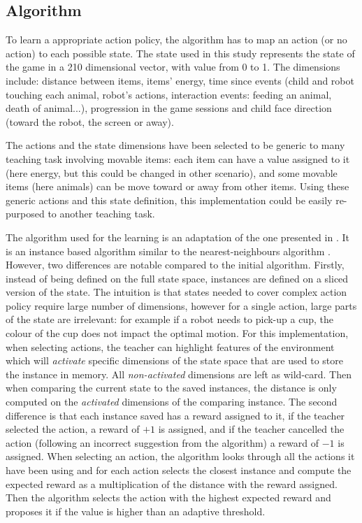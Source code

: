 \subsection{Algorithm}

To learn a appropriate action policy, the algorithm has to map an action (or no action) to each possible state. The state used in this study represents the state of the game in a 210 dimensional vector, with value from 0 to 1. The dimensions include: distance between items, items' energy, time since events (child and robot touching each animal, robot's actions, interaction events: feeding an animal, death of animal...), progression in the game sessions and child face direction (toward the robot, the screen or away).

The actions and the state dimensions have been selected to be generic to many teaching task involving movable items: each item can have a value assigned to it (here energy, but this could be changed in other scenario), and some movable items (here animals) can be move toward or away from other items. Using these generic actions and this state definition, this implementation could be easily re-purposed to another teaching task.

The algorithm used for the learning is an adaptation of the one presented in \cite{senft2017toward}. It is an instance based algorithm similar to the nearest-neighbours algorithm \cite{cover1967nearest}. However, two differences are notable compared to the initial algorithm. Firstly, instead of being defined on the full state space, instances are defined on a sliced version of the state. The intuition is that states needed to cover complex action policy require large number of dimensions, however for a single action, large parts of the state are irrelevant: for example if a robot needs to pick-up a cup, the colour of the cup does not impact the optimal motion. For this implementation, when selecting actions, the teacher can highlight features of the environment which will \textit{activate} specific dimensions of the state space that are used to store the instance in memory. All \textit{non-activated} dimensions are left as wild-card. Then when comparing the current state to the saved instances, the distance is only computed on the \textit{activated} dimensions of the comparing instance. The second difference is that each instance saved has a reward assigned to it, if the teacher selected the action, a reward of $+1$ is assigned, and if the teacher cancelled the action (following an incorrect suggestion from the algorithm) a reward of $-1$ is assigned. When selecting an action, the algorithm looks through all the actions it have been using and for each action selects the closest instance and compute the expected reward as a multiplication of the distance with the reward assigned. Then the algorithm selects the action with the highest expected reward and proposes it if the value is higher than an adaptive threshold. 

